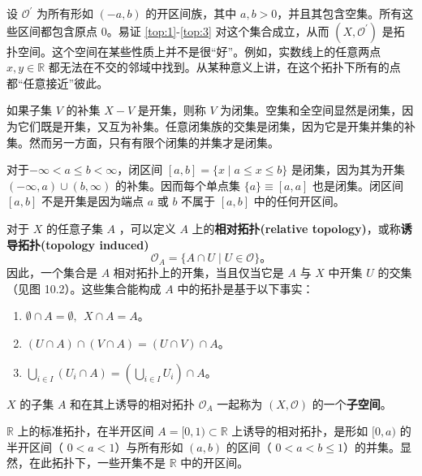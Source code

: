 \begin{eg}\label{eg:10.2}
	设 $\mathcal{O} ^{\prime}$ 为所有形如 $(-a,b)$ 的开区间族，其中 $a,b >0$，并且其包含空集。所有这些区间都包含原点 0。易证 \ref{top:1}-\ref{top:3} 对这个集合成立，从而 $(X,\mathcal{O} ^{\prime})$ 是拓扑空间。这个空间在某些性质上并不是很“好”。例如，实数线上的任意两点 $x,y\in \mathbb{R}$ 都无法在不交的邻域中找到。从某种意义上讲，在这个拓扑下所有的点都“任意接近”彼此。
\end{eg}

	如果子集 $V$ 的补集 $X-V$ 是开集，则称 $V$ 为闭集。空集和全空间显然是闭集，因为它们既是开集，又互为补集。任意闭集族的交集是闭集，因为它是开集并集的补集。然而另一方面，只有有限个闭集的并集才是闭集。

\begin{eg}\label{eg:10.3}
	 对于$-\infty < a\leq b< \infty $，闭区间 $[a,b]=\{x\mid a\leq x\leq b\}$ 是闭集，因为其为开集 $(-\infty ,a)\cup (b,\infty )$ 的补集。因而每个单点集 $\{a\}\equiv [a,a]$ 也是闭集。闭区间 $[a,b]$ 不是开集是因为端点 $a$ 或 $b$ 不属于 $[a,b]$ 中的任何开区间。
\end{eg}

对于 $X$ 的任意子集 $A$ ，可以定义 $A$ 上的\textbf{相对拓扑(relative topology)}，或称\textbf{诱导拓扑(topology induced)}
\begin{equation*}
    \mathcal{O}_{A} =\{A\cap U\mid U\in \mathcal{O} \}。
\end{equation*}
因此，一个集合是 $A$ 相对拓扑上的开集，当且仅当它是 $A$ 与 $X$ 中开集 $U$ 的交集（见图 10.2）。这些集合能构成 $A$ 中的拓扑是基于以下事实：

\begin{enumerate}[label=(\arabic*)]
	\item		$\emptyset \cap A=\emptyset ,\ \ X\cap A=A$。
	\item		$(U\cap A)\cap (V\cap A)=(U\cap V)\cap A$。
	\item		$\bigcup _{i\in I} (U_{i} \cap A)=\left(\bigcup _{i\in I} U_{i}\right) \cap A$。
\end{enumerate}

 $X$ 的子集 $A$ 和在其上诱导的相对拓扑 $\mathcal{O}_{A}$ 一起称为 $(X,\mathcal{O} )$ 的一个\textbf{子空间}。

\begin{eg}\label{eg:10.4}
	$\mathbb{R}$ 上的标准拓扑，在半开区间 $A=[ 0,1)\subset \mathbb{R}$ 上诱导的相对拓扑，是形如 $[0,a)$ 的半开区间（ $0< a< 1$）与所有形如 $(a,b)$ 的区间（ $0< a< b\leq 1$）的并集。显然，在此拓扑下，一些开集不是 $\mathbb{R}$ 中的开区间。
\end{eg}

